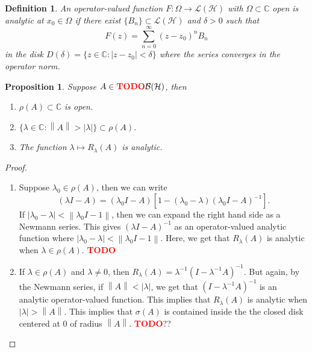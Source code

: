 \documentclass{article}
\newtheorem*{proposition}{Proposition}
\newtheorem*{definition}{Definition}
\newcommand{\C}{\mathbb{C}}
\newcommand{\B}{\mathcal{B}}
\renewcommand{\H}{\mathcal{H}}
\renewcommand{\L}{\mathcal{L}}
\newcommand{\norm}[1]{\left\lVert#1 \right\rVert}
\newcommand{\td}{\textcolor{red}{\textbf{TODO}}}
\begin{document}
\begin{definition}
    An operator-valued function $F : \Omega \to \L(\H)$ with $\Omega \subset \C$ open is analytic at $x_0 \in \Omega$ if there exist $\{B_n\} \subset \L(\H)$ and $\delta > 0$ such that 
    $$F(z) = \sum_{n=0}^{\infty}(z - z_0)^n B_n$$
    in the disk $D(\delta) = \{z \in \C : |z - z_0| < \delta\}$ where the series converges in the operator norm.
\end{definition}

\begin{proposition}
    Suppose $A \in \td \B(\H)$, then
    \begin{enumerate}
        \item $\rho(A) \subset \C$ is open.
        \item $\{\lambda \in \C : \norm{A} > |\lambda|\} \subset \rho(A)$.
        \item The function $\lambda \mapsto R_{\lambda}(A)$ is analytic.
    \end{enumerate}
\end{proposition}

\begin{proof}
    \begin{enumerate}
        \item Suppose $\lambda_0 \in \rho(A)$, then we can write 
        $$(\lambda I - A) = (\lambda_0 I - A)[1 - (\lambda_0 - \lambda)(\lambda_0 I - A)^{-1}].$$
        If $|\lambda_0 - \lambda| < \norm{\lambda_0 I - 1}$, then we can expand the right hand side as a Newmann series. This gives $(\lambda I - A)^{-1}$ as an operator-valued analytic function where $|\lambda_0 - \lambda| < \norm{\lambda_0 I - 1}$. Here, we get that $R_{\lambda}(A)$ is analytic when $\lambda \in \rho(A)$. \td
        \item If $\lambda \in \rho(A)$ and $\lambda \neq 0$, then $R_{\lambda}(A) = \lambda^{-1}(I - \lambda^{-1}A)^{-1}$. But again, by the Newmann series, if $\norm{A} < |\lambda|$, we get that $(I - \lambda^{-1}A)^{-1}$ is an analytic operator-valued function. This implies that $R_{\lambda}(A)$ is analytic when $|\lambda| > \norm{A}$. This implies that $\sigma(A)$ is contained inside the the closed disk centered at 0 of radius $\norm{A}$. \td ??
    \end{enumerate}
\end{proof}
\end{document}
